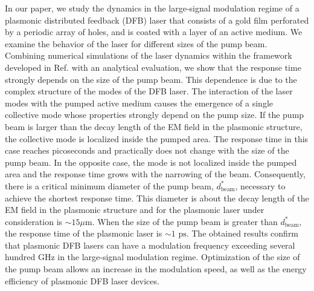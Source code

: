 \documentclass[aps,pra,amsmath,amssymb,onecolumn,superscriptaddress,showpacs,floatfix,]{revtex4-1}
\begin{document}
In our paper, we study the dynamics in the large-signal modulation regime of a plasmonic distributed feedback (DFB) laser that consists of a gold film perforated by a periodic array of holes, and is coated with a layer of an active medium.
We examine the behavior of the laser for different sizes of the pump beam.
Combining numerical simulations of the laser dynamics within the framework developed in Ref. \cite{Zyablovsky2017approach,nefedkin2018acsphot} with an analytical evaluation, we show that the response time strongly depends on the size of the pump beam.
This dependence is due to the complex structure of the modes of the DFB laser.
The interaction of the laser modes with the pumped active medium causes the emergence of a single collective mode whose properties strongly depend on the pump size.
If the pump beam is larger than the decay length of the EM field in the plasmonic structure, the collective mode is localized inside the pumped area.
The response time in this case reaches picoseconds and practically does not change with the size of the pump beam.
In the opposite case, the mode is not localized inside the pumped area and the response time grows with the narrowing of the beam.
Consequently, there is a critical minimum diameter of the pump beam, $d_{\text{beam}}^*$, necessary to achieve the shortest response time. This diameter is about the decay length of the EM field in the plasmonic structure and for the plasmonic laser under consideration is $\sim 15 \mu$m. When the size of the pump beam is greater than $d_{\text{beam}}^*$, the response time of the plasmonic laser is $\sim 1$ $\text{ps}$.
The obtained results confirm that plasmonic DFB lasers can have a modulation frequency exceeding several hundred GHz in the large-signal modulation regime. 
Optimization of the size of the pump beam allows an increase in the modulation speed, as well as the energy efficiency of plasmonic DFB laser devices.
\end{document}

